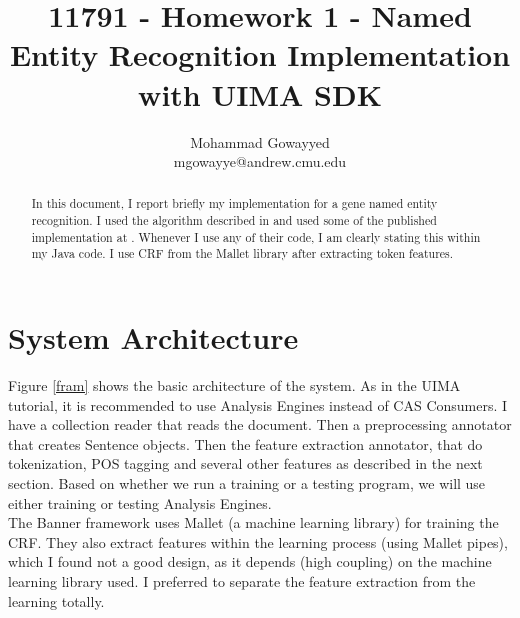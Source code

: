 \documentclass{article}
\begin{document}
\title{11791 - Homework 1 - Named Entity Recognition Implementation with UIMA SDK}
\author{Mohammad Gowayyed \\ mgowayye@andrew.cmu.edu}

\maketitle
\begin{abstract}
In this document, I report briefly my implementation for a gene named entity recognition. I used the algorithm described in \cite{banner} and used some of the published implementation at \cite{banner_code}. Whenever I use any of their code, I am clearly stating this within my Java code. I use CRF from the Mallet library after extracting token features.
\end{abstract}


\section{System Architecture}

Figure \ref{fram} shows the basic architecture of the system. As in the UIMA tutorial, it is recommended to use Analysis Engines instead of CAS Consumers. I have a collection reader that reads the document. Then a preprocessing annotator that creates Sentence objects. Then the feature extraction annotator, that do tokenization, POS tagging and several other features as described in the next section. Based on whether we run a training or a testing program, we will use either training or testing Analysis Engines.\\

The Banner framework uses Mallet (a machine learning library) for training the CRF. They also extract features within the learning process (using Mallet pipes), which I found not a good design, as it depends ({high coupling}) on the machine learning library used. I preferred to separate the feature extraction from the learning totally.
\end{document}
